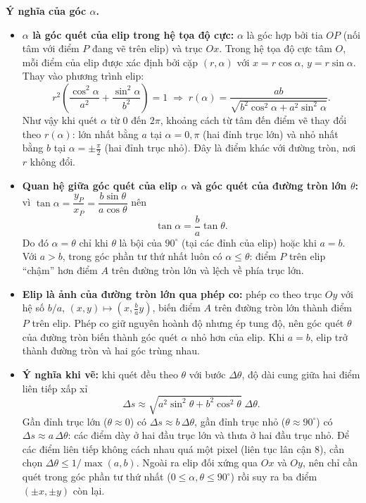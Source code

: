 \textbf{Ý nghĩa của góc $\alpha$.}
\begin{itemize}
    \item \textbf{$\alpha$ là góc quét của elip trong hệ tọa độ cực:} $\alpha$ là góc hợp bởi tia $OP$ (nối tâm với điểm $P$ đang vẽ trên elip) và trục $Ox$. Trong hệ tọa độ cực tâm $O$, mỗi điểm của elip được xác định bởi cặp $(r, \alpha)$ với $x = r\cos\alpha$, $y = r\sin\alpha$. Thay vào phương trình elip:
    \begin{equation}
    r^2\left(\frac{\cos^2\alpha}{a^2} + \frac{\sin^2\alpha}{b^2}\right) = 1 \;\Longrightarrow\; r(\alpha) = \frac{ab}{\sqrt{b^2\cos^2\alpha + a^2\sin^2\alpha}}.
    \end{equation}
    Như vậy khi quét $\alpha$ từ $0$ đến $2\pi$, khoảng cách từ tâm đến điểm vẽ thay đổi theo $r(\alpha)$: lớn nhất bằng $a$ tại $\alpha = 0, \pi$ (hai đỉnh trục lớn) và nhỏ nhất bằng $b$ tại $\alpha = \pm\frac{\pi}{2}$ (hai đỉnh trục nhỏ). Đây là điểm khác với đường tròn, nơi $r$ không đổi.
    \item \textbf{Quan hệ giữa góc quét của elip $\alpha$ và góc quét của đường tròn lớn $\theta$:} vì $\tan\alpha = \dfrac{y_P}{x_P} = \dfrac{b\sin\theta}{a\cos\theta}$ nên
    \begin{equation}
    \tan\alpha = \frac{b}{a}\tan\theta.
    \end{equation}
    Do đó $\alpha = \theta$ chỉ khi $\theta$ là bội của $90^\circ$ (tại các đỉnh của elip) hoặc khi $a = b$. Với $a > b$, trong góc phần tư thứ nhất luôn có $\alpha \le \theta$: điểm $P$ trên elip ``chậm'' hơn điểm $A$ trên đường tròn lớn và lệch về phía trục lớn.
    \item \textbf{Elip là ảnh của đường tròn lớn qua phép co:} phép co theo trục $Oy$ với hệ số $b/a$, $(x, y) \mapsto \left(x, \frac{b}{a}y\right)$, biến điểm $A$ trên đường tròn lớn thành điểm $P$ trên elip. Phép co giữ nguyên hoành độ nhưng ép tung độ, nên góc quét $\theta$ của đường tròn biến thành góc quét $\alpha$ nhỏ hơn của elip. Khi $a = b$, elip trở thành đường tròn và hai góc trùng nhau.
    \item \textbf{Ý nghĩa khi vẽ:} khi quét đều theo $\theta$ với bước $\Delta\theta$, độ dài cung giữa hai điểm liên tiếp xấp xỉ
    \begin{equation}
    \Delta s \approx \sqrt{a^2\sin^2\theta + b^2\cos^2\theta}\;\Delta\theta.
    \end{equation}
    Gần đỉnh trục lớn ($\theta \approx 0$) có $\Delta s \approx b\,\Delta\theta$, gần đỉnh trục nhỏ ($\theta \approx 90^\circ$) có $\Delta s \approx a\,\Delta\theta$: các điểm dày ở hai đầu trục lớn và thưa ở hai đầu trục nhỏ. Để các điểm liên tiếp không cách nhau quá một pixel (liên tục lân cận 8), cần chọn $\Delta\theta \le 1/\max(a, b)$. Ngoài ra elip đối xứng qua $Ox$ và $Oy$, nên chỉ cần quét trong góc phần tư thứ nhất ($0 \le \alpha, \theta \le 90^\circ$) rồi suy ra ba điểm $(\pm x, \pm y)$ còn lại.
\end{itemize}
